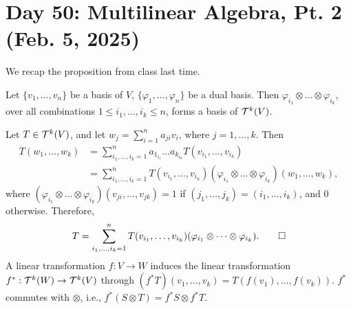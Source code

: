 \section{Day 50: Multilinear Algebra, Pt. 2 (Feb. 5, 2025)}
We recap the proposition from class last time.
\begin{simpleprop}
    Let $\{v_1, \dots, v_n\}$ be a basis of $V$, $\{\varphi_1, \dots, \varphi_n\}$ be a dual basis. Then $\varphi_{i_1} \otimes \dots \otimes \varphi_{i_k}$, over all combinations $1 \leq i_1, \dots, i_k \leq n$, forms a basis of $\mathcal T^k(V)$.
\end{simpleprop}
\noindent Let $T \in \mathcal T^k(V)$, and let $w_j = \sum_{i=1}^n a_{ji} v_i$, where $j = 1, \dots, k$. Then
\begin{align*}
    T(w_1, \dots, w_k) &= \sum_{i_1, \dots, i_k = 1}^n a_{1_{i_1}} \dots a_{k_{i_k}}T(v_{i_1}, \dots, v_{i_k}) \\
    &= \sum_{i_1, \dots, i_k = 1}^n T(v_{i_1}, \dots, v_{i_k}) (\varphi_{i_1} \otimes \dots \otimes \varphi_{i_k}) (w_1, \dots, w_k), 
\end{align*}
where $(\varphi_{i_1} \otimes \dots \otimes \varphi_{i_k})(v_{ji}, \dots, v_{jk}) = 1$ if $(j_1, \dots, j_k) = (i_1, \dots, i_k)$, and $0$ otherwise. Therefore,
\[ T = \sum_{i_1, \dots, i_k = 1}^n T(v_{i_1}, \dots, v_{i_k}) (\varphi_{i_1} \otimes \dots \otimes \varphi_{i_k}). \qed \]
A linear transformation $f : V \to W$ induces the linear transformation $f^\ast : \mathcal T^k(W) \to \mathcal T^k(V)$ through $(f^\ast T)(v_1, \dots, v_k) = T(f(v_1), \dots, f(v_k))$. $f^\ast$ commutes with $\otimes$, i.e., $f^\ast(S \otimes T) = f^\ast S \otimes f^\ast T$.
